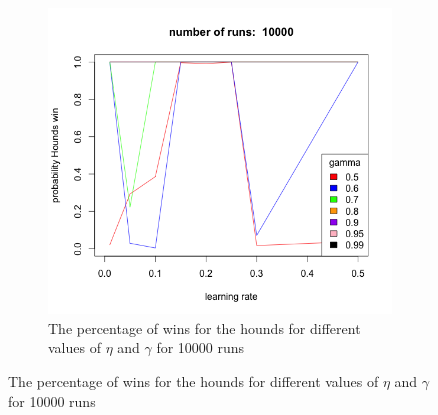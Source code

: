 \begin{figure}[bt]
\begin{subfigure}{0.49\textwidth}
        \includegraphics[width=\textwidth]{r10000}
        \caption{The percentage of wins for the hounds for different values
            of $\eta$ and $\gamma$ for 10000 runs}
        \label{fig:r10000}
    \end{subfigure}
    

\end{figure}
